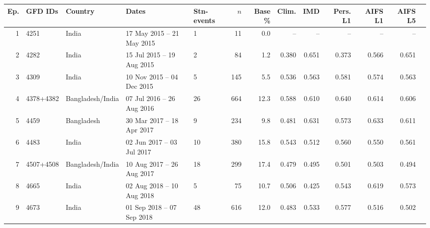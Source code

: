 \begin{tabular}{rllllrrrrrrrr}\toprule Ep. & GFD IDs & Country & Dates & Stn-events & $n$ & Base \% & Clim. & IMD & Pers. L1 & AIFS L1 & AIFS L5 \\ \midrule
1 & 4251 & India & 17 May 2015 -- 21 May 2015 & 1 & 11 & 0.0 & -- & -- & -- & -- & -- \\
2 & 4282 & India & 15 Jul 2015 -- 19 Aug 2015 & 2 & 84 & 1.2 & 0.380 & 0.651 & 0.373 & 0.566 & 0.651 \\
3 & 4309 & India & 10 Nov 2015 -- 04 Dec 2015 & 5 & 145 & 5.5 & 0.536 & 0.563 & 0.581 & 0.574 & 0.563 \\
4 & 4378+4382 & Bangladesh/India & 07 Jul 2016 -- 26 Aug 2016 & 26 & 664 & 12.3 & 0.588 & 0.610 & 0.640 & 0.614 & 0.606 \\
5 & 4459 & Bangladesh & 30 Mar 2017 -- 18 Apr 2017 & 9 & 234 & 9.8 & 0.481 & 0.631 & 0.573 & 0.633 & 0.611 \\
6 & 4483 & India & 02 Jun 2017 -- 03 Jul 2017 & 10 & 380 & 15.8 & 0.543 & 0.512 & 0.560 & 0.550 & 0.561 \\
7 & 4507+4508 & Bangladesh/India & 10 Aug 2017 -- 26 Aug 2017 & 18 & 299 & 17.4 & 0.479 & 0.495 & 0.501 & 0.503 & 0.494 \\
8 & 4665 & India & 02 Aug 2018 -- 10 Aug 2018 & 5 & 75 & 10.7 & 0.506 & 0.425 & 0.543 & 0.619 & 0.573 \\
9 & 4673 & India & 01 Sep 2018 -- 07 Sep 2018 & 48 & 616 & 12.0 & 0.483 & 0.533 & 0.577 & 0.516 & 0.502 \\
\bottomrule\end{tabular}